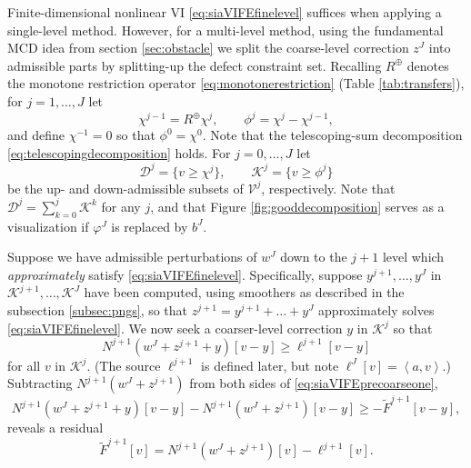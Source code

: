 \documentclass[letterpaper,final,12pt,reqno]{amsart}
\theoremstyle{claim}
\newcommand{\ip}[2]{\left<#1,#2\right>}
\newcommand{\mR}{R^{\bm{\oplus}}}
\numberwithin{equation}{section}
\numberwithin{figure}{section}
\numberwithin{table}{section}
\numberwithin{theorem}{section}
\begin{document}
Finite-dimensional nonlinear VI \eqref{eq:siaVIFEfinelevel} suffices when applying a single-level method.  However, for a multi-level method, using the fundamental MCD idea from section \ref{sec:obstacle} we split the coarse-level correction $z^J$ into admissible parts by splitting-up the defect constraint set.  Recalling $\mR$ denotes the monotone restriction operator \eqref{eq:monotonerestriction} (Table \ref{tab:transfers}), for $j=1,\dots,J$ let
    $$\chi^{j-1} = \mR \chi^j, \qquad \phi^j = \chi^j - \chi^{j-1},$$
and define $\chi^{-1}=0$ so that $\phi^0=\chi^0$.  Note that the telescoping-sum decomposition \eqref{eq:telescopingdecomposition} holds.  For $j=0,\dots,J$ let
    $$\mathcal{D}^j = \{v \ge \chi^j\}, \qquad \mathcal{K}^j = \{v \ge \phi^j\}$$
be the up- and down-admissible subsets of $\mathcal{V}^j$, respectively.  Note that $\mathcal{D}^j = \sum_{k=0}^j \mathcal{K}^k$ for any $j$, and that Figure \ref{fig:gooddecomposition} serves as a visualization if $\varphi^J$ is replaced by $b^J$.

Suppose we have admissible perturbations of $w^J$ down to the $j+1$ level which \emph{approximately} satisfy \eqref{eq:siaVIFEfinelevel}.  Specifically, suppose $y^{j+1},\dots,y^J$ in $\mathcal{K}^{j+1},\dots,\mathcal{K}^J$ have been computed, using smoothers as described in the subsection \ref{subsec:pngs}, so that $z^{j+1}=y^{j+1}+\dots+y^J$ approximately solves \eqref{eq:siaVIFEfinelevel}.  We now seek a coarser-level correction $y$ in $\mathcal{K}^j$ so that
\begin{equation}
N^{j+1}(w^J+z^{j+1}+y)[v-y] \ge \ell^{j+1}[v-y] \label{eq:siaVIFEprecoarseone}
\end{equation}
for all $v$ in $\mathcal{K}^j$.  (The source $\ell^{j+1}$ is defined later, but note $\ell^J[v] = \ip{a}{v}$.)  Subtracting $N^{j+1}(w^J+z^{j+1})$ from both sides of \eqref{eq:siaVIFEprecoarseone},
\begin{equation}
N^{j+1}(w^J+z^{j+1}+y)[v-y] - N^{j+1}(w^J+z^{j+1})[v-y] \ge - \tilde F^{j+1}[v-y], \label{eq:siaVIFEprecoarsetwo}
\end{equation}
reveals a residual
\begin{equation}
\tilde F^{j+1}[v] = N^{j+1}(w^J+z^{j+1})[v] - \ell^{j+1}[v].
\end{equation}
\end{document}
